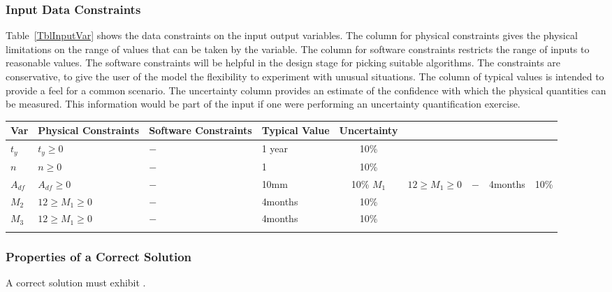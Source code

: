 \documentclass[12pt]{article}
\begin{document}
\subsubsection{Input Data Constraints} \label{sec_DataConstraints}    

Table~\ref{TblInputVar} shows the data constraints on the input output
variables.  The column for physical constraints gives the physical limitations
on the range of values that can be taken by the variable.  The column for
software constraints restricts the range of inputs to reasonable values.  The
software constraints will be helpful in the design stage for picking suitable
algorithms.  The constraints are conservative, to give the user of the model the
flexibility to experiment with unusual situations.  The column of typical values
is intended to provide a feel for a common scenario.  The uncertainty column
provides an estimate of the confidence with which the physical quantities can be
measured.  This information would be part of the input if one were performing an
uncertainty quantification exercise.

\begin{table}[!h]
  \caption{Input Variables} \label{TblInputVar}
  \renewcommand{\arraystretch}{1.2}
\noindent \begin{longtable*}{l l l l c} 
  \toprule
  \textbf{Var} & \textbf{Physical Constraints} & \textbf{Software Constraints} &
                             \textbf{Typical Value} & \textbf{Uncertainty}\\
  \midrule 
  $t_y$ & $t_y \ge 0$ & $-$ & 1 year & 10\% \\
  $n$ & $n \ge 0$ & $-$ & 1 & 10\% \\
  $A_{df}$ & $A_{df} \ge 0$ & $-$ & 10mm & 10\%
  $M_1$ & $12 \ge M_1 \ge 0$ & $-$ & 4months & 10\% \\
  $M_2$ & $12 \ge M_1 \ge 0$ & $-$ & 4months & 10\% \\
  $M_3$ & $12 \ge M_1 \ge 0$ & $-$ & 4months & 10\% \\
  \\
  \bottomrule
\end{longtable*}
\end{table}

\subsubsection{Properties of a Correct Solution} \label{sec_CorrectSolution}

\noindent
A correct solution must exhibit .  
\end{document}
